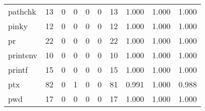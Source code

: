 \begin{longtable}{lp{1.3cm}p{1.3cm}p{1.3cm}p{1.3cm}p{1.3cm}p{1.3cm}p{1.3cm}p{1.3cm}p{1.3cm}}
pathchk   &                     13 &                                             0 &                                            0 &                                           0 &                                            0 &                                         13 &                                1.000 &                                  1.000 &                                1.000 \\
pinky     &                     12 &                                             0 &                                            0 &                                           0 &                                            0 &                                         12 &                                1.000 &                                  1.000 &                                1.000 \\
pr        &                     22 &                                             0 &                                            0 &                                           0 &                                            0 &                                         22 &                                1.000 &                                  1.000 &                                1.000 \\
printenv  &                     10 &                                             0 &                                            0 &                                           0 &                                            0 &                                         10 &                                1.000 &                                  1.000 &                                1.000 \\
printf    &                     15 &                                             0 &                                            0 &                                           0 &                                            0 &                                         15 &                                1.000 &                                  1.000 &                                1.000 \\
ptx       &                     82 &                                             0 &                                            1 &                                           0 &                                            0 &                                         81 &                                0.991 &                                  1.000 &                                0.988 \\
pwd       &                     17 &                                             0 &                                            0 &                                           0 &                                            0 &                                         17 &                                1.000 &                                  1.000 &                                1.000 \\

\end{longtable}
